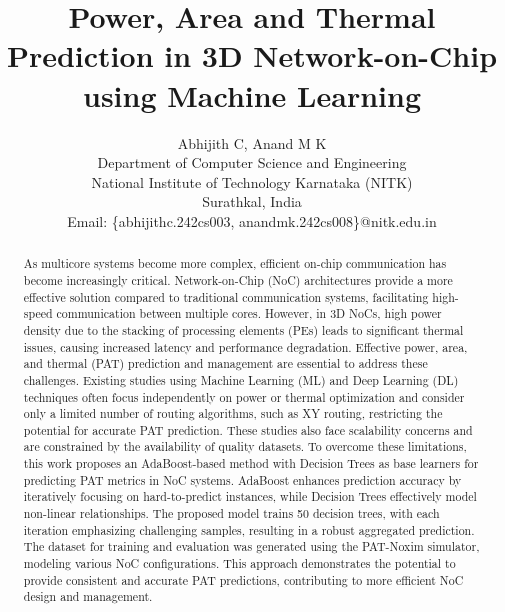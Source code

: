 \documentclass[conference]{IEEEtran}
\begin{document}
\title{Power, Area and Thermal Prediction in 3D Network-on-Chip using Machine Learning}

\author{Abhijith C, Anand M K \\

Department of Computer Science and Engineering \\ 
	National Institute of Technology Karnataka (NITK) \\ 
	Surathkal, India\\
Email: \{abhijithc.242cs003, anandmk.242cs008\}@nitk.edu.in}


\maketitle

\begin{abstract}
As multicore systems become more complex, efficient on-chip communication has become increasingly critical. Network-on-Chip (NoC) architectures provide a more effective solution compared to traditional communication systems, facilitating high-speed communication between multiple cores. However, in 3D NoCs, high power density due to the stacking of processing elements (PEs) leads to significant thermal issues, causing increased latency and performance degradation. Effective power, area, and thermal (PAT) prediction and management are essential to address these challenges. Existing studies using Machine Learning (ML) and Deep Learning (DL) techniques often focus independently on power or thermal optimization and consider only a limited number of routing algorithms, such as XY routing, restricting the potential for accurate PAT prediction. These studies also face scalability concerns and are constrained by the availability of quality datasets. To overcome these limitations, this work proposes an AdaBoost-based method with Decision Trees as base learners for predicting PAT metrics in NoC systems. AdaBoost enhances prediction accuracy by iteratively focusing on hard-to-predict instances, while Decision Trees effectively model non-linear relationships. The proposed model trains 50 decision trees, with each iteration emphasizing challenging samples, resulting in a robust aggregated prediction. The dataset for training and evaluation was generated using the PAT-Noxim simulator, modeling various NoC configurations. This approach demonstrates the potential to provide consistent and accurate PAT predictions, contributing to more efficient NoC design and management.
\end{abstract}
\end{document}
